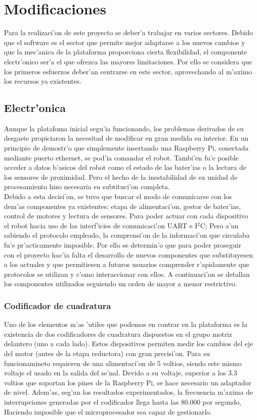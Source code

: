 \documentclass[twoside,12pt]{article}
\begin{document}
\newpage
\section{Modificaciones}
Para la realizaci'on de este proyecto se deber'a trabajar en varios sectores. Debido que el software es el sector que permite mejor adaptarse a los nuevos cambios y que la mec'anica de la plataforma proporciona cierta flexibilidad, el componente electr'onico ser'a el que ofrezca las mayores limitaciones. Por ello se considera que los primeros esfuerzos deber'an centrarse en este sector, aprovechando al m'aximo los recursos ya existentes.

\subsection{Electr'onica}
Aunque la platafoma inicial segu'ia funcionando, los problemas derivados de su desgaste propiciaron la necesitad de modificar en gran medida su interior. En un principio de demostr'o que simplemente insertando una Raspberry Pi, conectada mediante puerto ethernet, se pod'ia comandar el robot. Tambi'en fu'e posible acceder a datos b'asicos del robot como el estado de las bater'ias o la lectura de los sensores de proximidad. Pero el hecho de la inestabilidad de su unidad de procesamiento hizo necesaria su subtituci'on completa.\\

Debido a esta decisi'on, se tuvo que buscar el modo de comunicarse con los dem'as componentes ya existentes: etapa de alimentaci'on, gestor de bater'ias, control de motores y lectura de sensores. Para poder actuar con cada dispositivo el robot hacia uso de las interf'icies de comunicaci'on UART e I$^{2}$C; Pero a'un sabiendo el protocolo empleado, la comprensi'on de la informaci'on que circulaba fu'e pr'acticamente imposible. Por ello se determin'o que para poder proseguir con el proyecto hac'ia falta el desarrollo de nuevos componentes que substituyesen a los actuales y que permitiesen a futuros usuarios comprender r'apidamente que protocolos se utilizan y c'omo interaccionar con ellos. A continuaci'on se detallan los componentes utilizados seguiendo un orden de mayor a menor restrictivo.

\subsubsection{Codificador de cuadratura}
Uno de los elementos m'as 'utiles que podemos en contrar en la plataforma es la existencia de dos codificadores de cuadratura dispuestos en el grupo motriz delantero (uno a cada lado). Estos dispositivos permiten medir los cambios del eje del motor (antes de la etapa reductora) con gran precisi'on. Para su funcionamineto requieren de una alimentaci'on de 5 voltios, siendo este mismo voltaje el usado en la salida del se'nal. Devido a su voltaje, superior a los 3.3 voltios que soportan los pines de la Raspberry Pi, se hace necesario un adaptador de nivel. Adem'as, seg'un los resultados experimentados, la frecuencia m'axima de interrupciones generadas por el codificador llega hasta las 80.000 por segundo, Haciendo imposible que el microprocesador sea capaz de gestionarlo.\\
\end{document}
